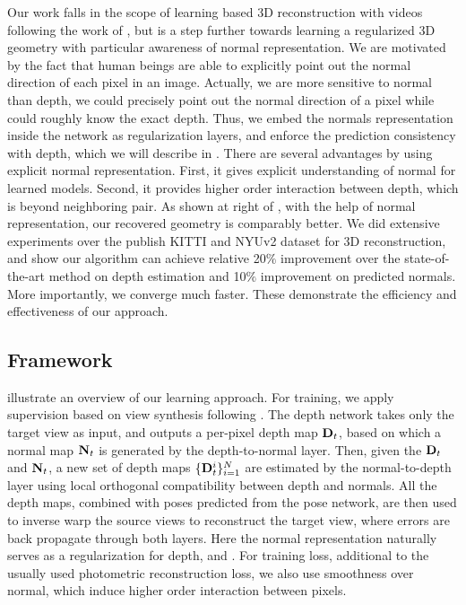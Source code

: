 Our work falls in the scope of learning based 3D reconstruction with videos following the work of \cite{zhou2017unsupervised}, but is a step further towards learning a regularized 3D geometry with particular awareness of normal representation. 
We are motivated by the fact that human beings are able to explicitly point out the normal direction of each pixel in an image. Actually, we are more sensitive to normal than depth, \eg we could precisely point out the normal direction of a pixel while could roughly know the exact depth. 
Thus, we embed the normals representation inside the network as regularization layers, and enforce the prediction consistency with depth, which we will describe in .
There are several advantages by using explicit normal representation. First, it gives explicit understanding of normal for learned models.  Second, it provides higher order interaction between depth, which is beyond neighboring pair. 
As shown at right of , with the help of normal representation, our recovered geometry is comparably better. We did extensive experiments over the publish KITTI and NYUv2 dataset for 3D reconstruction, and show our algorithm can achieve relative 20$\%$ improvement over the state-of-the-art method on depth estimation and 10$\%$ improvement on predicted normals. More importantly, we converge much faster. These demonstrate the efficiency and effectiveness of our approach.



\subsection{Framework}
 illustrate an overview of our learning approach. For training, we apply supervision based on view synthesis following \cite{zhou2017unsupervised}. The depth network takes only the target view as input, and
outputs a per-pixel depth map ${\mathbf D}_t$, based on which a normal map ${\mathbf N}_t$ is generated by the depth-to-normal layer. Then, given the ${\mathbf D}_t$ and ${\mathbf N}_t$, a new set of depth maps $\{{\mathbf D}_t^i\}_{i=1}^{N}$ are estimated by the normal-to-depth layer using local orthogonal compatibility between depth and normals. 
All the depth maps, combined with poses predicted from the pose network, are then used to inverse warp the source views to reconstruct the target view, where errors are back propagate through both layers. Here the normal representation naturally serves as a regularization for depth, and . For training loss, additional to the usually used photometric reconstruction loss, we also use smoothness over normal, which induce higher order interaction between pixels. 

